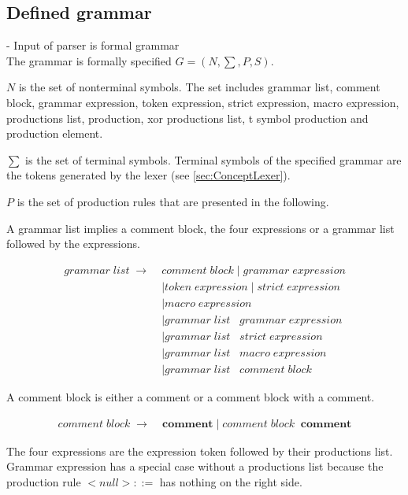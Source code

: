 \subsection{Defined grammar}\label{sec:ImplementationGrammar}

- Input of parser is formal grammar \\

The grammar is formally specified $G = (N,\sum,P,S)$.

$N$ is the set of nonterminal symbols. The set includes grammar list, comment block, grammar expression, token expression, strict expression, macro expression, productions list, production, xor productions list, t symbol production and production element.

$\sum$ is the set of terminal symbols. Terminal symbols of the specified grammar are the tokens generated by the lexer (see \ref{sec:ConceptLexer}).

$P$ is the set of production rules that are presented in the following. 

A grammar list implies a comment block, the four expressions or a grammar list followed by the expressions.

\begin{align*}
	grammar\;list\; \rightarrow\; &comment\;block
	     		\mid grammar\;expression  \\
			   &\mid token\;expression
                \mid strict\;expression\\
               &\mid macro\;expression \\
               &\mid grammar\;list\;\;\;grammar\;expression\\
               &\mid grammar\;list\;\;\;strict\;expression \\
               &\mid grammar\;list\;\;\;macro\;expression \\
               &\mid grammar\;list\;\;\;comment\;block               
\end{align*}

A comment block is either a comment or a comment block with a comment.

\begin{align*}
    comment\;block\; \rightarrow\; &\textbf{comment}
                \mid comment\;block\;\;\textbf{comment}
\end{align*}

The four expressions are the expression token followed by their productions list. Grammar expression has a special case without a productions list because the production rule $ <null> ::= $ has nothing on the right side. 

